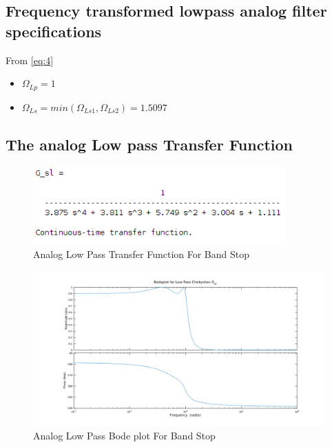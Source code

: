 \documentclass[22pt]{article}
\begin{document}
\subsection{Frequency transformed lowpass analog filter specifications}
From \ref{eq:4}
\begin{itemize}
\item $\Omega_{Lp} = 1$
\item $\Omega_{Ls} = min(\Omega_{Ls1},\Omega_{Ls2}) = 1.5097$
\end{itemize}

\subsection{The analog Low pass Transfer Function}
\begin{figure}[H]
  \centering
  \includegraphics[height=3cm]{images/Analog_cheb_lp_tf}
  \caption{Analog Low Pass Transfer Function For Band Stop}
  \label{fig:9}
\end{figure}
\begin{figure}[H]
  \centering
  \includegraphics[scale=0.5]{images/Bodeplot_cheb_lp}
  \caption{Analog Low Pass Bode plot For Band Stop}
  \label{fig:10}
\end{figure}
\end{document}
